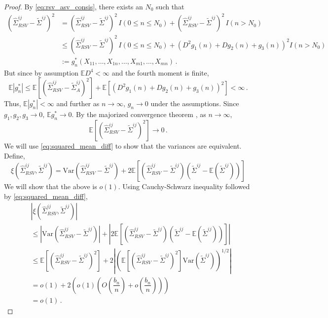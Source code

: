 \documentclass[12pt]{article}
\newcommand{\E}{\mathbb{E}}
\newcommand{\Var}{\text{Var}}
\begin{document}
\begin{proof}
By \eqref{eq:rsv_asv_consis}, there exists an $N_0$ such that
\begin{align*}
\left(\hat{\Sigma}_{RSV}^{ij} - \tilde{\Sigma}^{ij} \right)^2 &= \left(\hat{\Sigma}_{RSV}^{ij} - \tilde{\Sigma}^{ij} \right)^2 \, I(0 \leq n \leq N_0) + \left(\hat{\Sigma}_{RSV}^{ij} - \tilde{\Sigma}^{ij} \right)^2 \, I(n > N_0)\\
& \leq \left(\hat{\Sigma}_{RSV}^{ij} - \tilde{\Sigma}^{ij} \right)^2 \, I(0 \leq n \leq N_0) +  \left(D^2g_1(n) + Dg_2(n) + g_3(n) \right)^2 I(n > N_0)\\
& := g_n^*(X_{11}, \dots, X_{1n}, \dots, X_{m1}, \dots, X_{mn})\,.
\end{align*}
But since by assumption $\E D^4 <\infty$ and the fourth moment is finite,
\[
\E \left| g_n^* \right| \leq  \E \left[\left(\hat{\Sigma}_{RSV}^{ij} - \tilde{\Sigma}_{A}^{ij} \right)^2 \right] + \E \left[\left(D^2g_1(n) + Dg_2(n) + g_3(n) \right)^2 \right] < \infty\,.
\]
Thus, $\E \left| g_n^* \right| < \infty$ and further as $n \to \infty$, $g_n \to 0$ under the assumptions. Since $g_1, g_2, g_3 \to 0$, $\E g_n^* \to 0$. By the majorized convergence theorem \citep{zeid:2013}, as $n \to \infty$,
\begin{equation}
\label{eq:squared_mean_diff}
  \E \left[\left(\hat{\Sigma}_{RSV}^{ij} - \tilde{\Sigma}^{ij} \right)^2 \right] \to 0\,.
\end{equation}
%
We will use \eqref{eq:squared_mean_diff} to show that the variances are equivalent. Define,
\[
\xi\left(\hat{\Sigma}_{RSV}^{ij}, \tilde{\Sigma}^{ij} \right) = \Var\left(\hat{\Sigma}_{RSV}^{ij} - \tilde{\Sigma}^{ij} \right) + 2 \E\left[ \left(\hat{\Sigma}_{RSV}^{ij} -  \tilde{\Sigma}^{ij} \right) \left(\tilde{\Sigma}^{ij}  - \E \left( \tilde{\Sigma}^{ij} \right) \right) \right]
\]
We will show that the above is $o(1)$. Using Cauchy-Schwarz inequality followed by \eqref{eq:squared_mean_diff},
\begin{align*}
& \left|  \xi\left(\hat{\Sigma}_{RSV}^{ij}, \tilde{\Sigma}^{ij} \right) \right|\\
& \leq \left| \Var\left(\hat{\Sigma}_{RSV}^{ij} -  \tilde{\Sigma}^{ij} \right) \right| + \left| 2 \E\left[ \left(\hat{\Sigma}_{RSV}^{ij} - \tilde{\Sigma}^{ij} \right) \left(\tilde{\Sigma}^{ij}  - \E \left( \tilde{\Sigma}^{ij} \right) \right) \right]\right| \\ 
& \leq \E\left[\left(\hat{\Sigma}_{RSV}^{ij} -  \tilde{\Sigma}^{ij} \right)^2 \right] + 2 \left| \left(\E\left[ \left(\hat{\Sigma}_{RSV}^{ij} - \tilde{\Sigma}^{ij} \right)^2 \right]  \Var\left(\tilde{\Sigma}^{ij}  \right)   \right)^{1/2}\right| \\ 
& = o(1) + 2\left(o(1) \left(O\left( \dfrac{b_n}{n}\right)  + o\left( \dfrac{b_n}{n}\right) \right)  \right) \\ 
& = o(1)\,.
\end{align*}


\end{proof}
\end{document}
